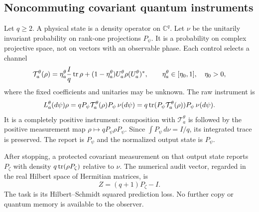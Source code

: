 \subsection{Noncommuting covariant quantum instruments}
Let $q\ge2$. A physical state is a density operator on $\mathbb C^q$. Let $\nu$ be the unitarily invariant probability on rank-one projections $P_\psi$. It is a probability on complex projective space, not on vectors with an observable phase. Each control selects a channel
\begin{equation}\label{eq:quantum-channel}
 \mathcal T_a^\theta(\rho)=\eta_a^\theta\frac{I}{q}\operatorname{tr}\rho
            +(1-\eta_a^\theta)U_a^\theta\rho(U_a^\theta)^*,
 \qquad \eta_a^\theta\in[\eta_0,1],\quad \eta_0>0,
\end{equation}
where the fixed coefficients and unitaries may be unknown. The raw instrument is
\begin{equation}\label{eq:quantum-instrument}
 L_a^\theta(d\psi)\rho
   =qP_\psi\mathcal T_a^\theta(\rho)P_\psi\,\nu(d\psi)
   =q\operatorname{tr}(P_\psi\mathcal T_a^\theta(\rho))P_\psi\,\nu(d\psi).
\end{equation}
It is a completely positive instrument: composition with $\mathcal T_a^\theta$ is followed by the positive measurement map $\rho\mapsto qP_\psi\rho P_\psi$. Since $\int P_\psi\,d\nu=I/q$, its integrated trace is preserved. The report is $P_\psi$ and the normalized output state is $P_\psi$.

After stopping, a protected covariant measurement on that output state reports $P_\zeta$ with density $q\operatorname{tr}(\rho P_\zeta)$ relative to $\nu$. The numerical audit vector, regarded in the real Hilbert space of Hermitian matrices, is
\begin{equation}\label{eq:quantum-audit}
 Z=(q+1)P_\zeta-I.
\end{equation}
The task is its Hilbert--Schmidt squared prediction loss. No further copy or quantum memory is available to the observer.

